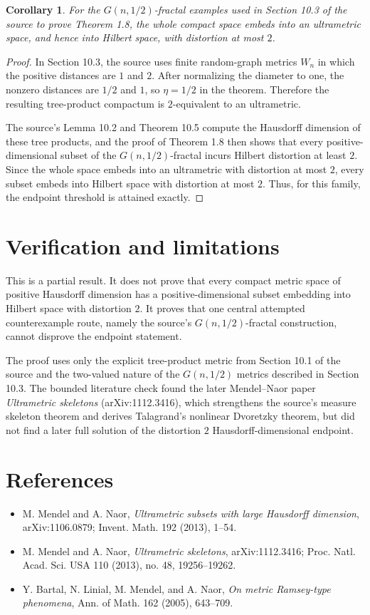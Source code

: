 \documentclass[11pt]{article}
\newtheorem*{corollary*}{Corollary}
\begin{document}
\begin{corollary*}
For the \(G(n,1/2)\)-fractal examples used in Section 10.3 of the source to
prove Theorem 1.8, the whole compact space embeds into an ultrametric space,
and hence into Hilbert space, with distortion at most \(2\).
\end{corollary*}

\begin{proof}
In Section 10.3, the source uses finite random-graph metrics \(W_n\) in which
the positive distances are \(1\) and \(2\). After normalizing the diameter to
one, the nonzero distances are \(1/2\) and \(1\), so \(\eta=1/2\) in the
theorem. Therefore the resulting tree-product compactum is \(2\)-equivalent
to an ultrametric.

The source's Lemma 10.2 and Theorem 10.5 compute the Hausdorff dimension of
these tree products, and the proof of Theorem 1.8 then shows that every
positive-dimensional subset of the \(G(n,1/2)\)-fractal incurs Hilbert
distortion at least \(2\). Since the whole space embeds into an ultrametric
with distortion at most \(2\), every subset embeds into Hilbert space with
distortion at most \(2\). Thus, for this family, the endpoint threshold is
attained exactly.
\end{proof}

\section*{Verification and limitations}

This is a partial result. It does not prove that every compact metric space of
positive Hausdorff dimension has a positive-dimensional subset embedding into
Hilbert space with distortion \(2\). It proves that one central attempted
counterexample route, namely the source's \(G(n,1/2)\)-fractal construction,
cannot disprove the endpoint statement.

The proof uses only the explicit tree-product metric from Section 10.1 of the
source and the two-valued nature of the \(G(n,1/2)\) metrics described in
Section 10.3. The bounded literature check found the later
Mendel--Naor paper \emph{Ultrametric skeletons} (arXiv:1112.3416), which
strengthens the source's measure skeleton theorem and derives Talagrand's
nonlinear Dvoretzky theorem, but did not find a later full solution of the
distortion \(2\) Hausdorff-dimensional endpoint.

\section*{References}

\begin{itemize}
\item M. Mendel and A. Naor, \emph{Ultrametric subsets with large Hausdorff
  dimension}, arXiv:1106.0879; Invent. Math. 192 (2013), 1--54.
\item M. Mendel and A. Naor, \emph{Ultrametric skeletons}, arXiv:1112.3416;
  Proc. Natl. Acad. Sci. USA 110 (2013), no. 48, 19256--19262.
\item Y. Bartal, N. Linial, M. Mendel, and A. Naor, \emph{On metric
  Ramsey-type phenomena}, Ann. of Math. 162 (2005), 643--709.
\end{itemize}
\end{document}

